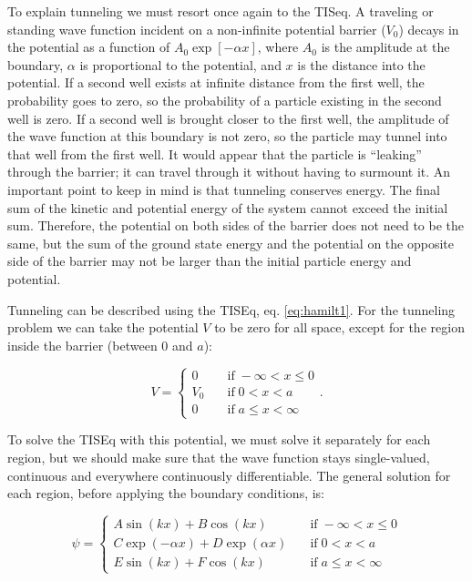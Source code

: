 \documentclass[
  9pt,
]{extbook}
\theoremstyle{definition}
\theoremstyle{definition}
\theoremstyle{definition}
\theoremstyle{remark}
\begin{document}
To explain tunneling we must resort once again to the TISeq. A traveling or standing wave function incident on a non-infinite potential barrier (\(V_0\)) decays in the potential as a function of \(A_0\exp[-\alpha x]\), where \(A_0\) is the amplitude at the boundary, \(\alpha\) is proportional to the potential, and \(x\) is the distance into the potential. If a second well exists at infinite distance from the first well, the probability goes to zero, so the probability of a particle existing in the second well is zero. If a second well is brought closer to the first well, the amplitude of the wave function at this boundary is not zero, so the particle may tunnel into that well from the first well. It would appear that the particle is ``leaking'' through the barrier; it can travel through it without having to surmount it. An important point to keep in mind is that tunneling conserves energy. The final sum of the kinetic and potential energy of the system cannot exceed the initial sum. Therefore, the potential on both sides of the barrier does not need to be the same, but the sum of the ground state energy and the potential on the opposite side of the barrier may not be larger than the initial particle energy and potential.

Tunneling can be described using the TISEq, eq. \eqref{eq:hamilt1}. For the tunneling problem we can take the potential \(V\) to be zero for all space, except for the region inside the barrier (between \(0\) and \(a\)):

\begin{equation}
V=\begin{cases} 0\quad&\text{if}\; -\infty<x\leq 0 \\ V_0\quad&\text{if}\; 0<x<a \\ 0\quad&\text{if}\; a\leq x< \infty \end{cases}.
\label{eq:tunn1}  
\end{equation}

To solve the TISEq with this potential, we must solve it separately for each region, but we should make sure that the wave function stays single-valued, continuous and everywhere continuously differentiable. The general solution for each region, before applying the boundary conditions, is:

\begin{equation}
\psi=\begin{cases} A\sin (kx)+B\cos (kx)\quad&\text{if}\; -\infty<x\leq 0 \\ C \exp(-\alpha x)+D\exp(\alpha x) \quad&\text{if}\; 0<x<a \\ E\sin (kx)+F\cos (kx) \quad&\text{if}\; a\leq x< \infty \end{cases}
\label{eq:tunn2}  
\end{equation}
\end{document}
